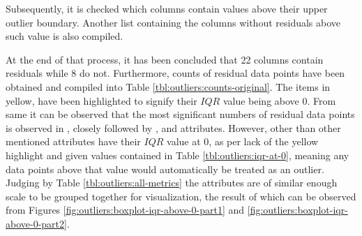 Subsequently, it is checked which columns contain values above their upper outlier boundary. Another list containing the columns without residuals above such value is also compiled. 

At the end of that process, it has been concluded that 22 columns contain residuals while 8 do not. Furthermore, counts of residual data points have been obtained and compiled into Table \ref{tbl:outliers:counts-original}. The items in yellow, have been highlighted to signify their $IQR$ value being above 0. From same it can be observed that the most significant numbers of residual data points is observed in \itUncoveredLines{}, closely followed by \overallUncoveredLines{}, \fileAgeInSec{} and \overallUncoveredConditions{} attributes. However, other than \fileAgeInSec{} other mentioned attributes have their $IQR$ value at 0, as per lack of the yellow highlight and given values contained in Table \ref{tbl:outliers:iqr-at-0}, meaning any data points above that value would automatically be treated as an outlier. Judging by Table \ref{tbl:outliers:all-metrics} the attributes are of similar enough scale to be grouped together for visualization, the result of which can be observed from Figures \ref{fig:outliers:boxplot-iqr-above-0-part1} and \ref{fig:outliers:boxplot-iqr-above-0-part2}. 

